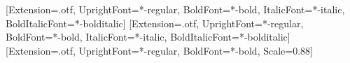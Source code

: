 \usepackage[preprint,nonatbib]{neurips_2025}
\usepackage{fontspec}
\setmainfont{texgyretermes}[Extension=.otf, UprightFont=*-regular, BoldFont=*-bold, ItalicFont=*-italic, BoldItalicFont=*-bolditalic]
\setsansfont{texgyreheros}[Extension=.otf, UprightFont=*-regular, BoldFont=*-bold, ItalicFont=*-italic, BoldItalicFont=*-bolditalic]
\setmonofont{texgyrecursor}[Extension=.otf, UprightFont=*-regular, BoldFont=*-bold, Scale=0.88]
\usepackage{newunicodechar}
\usepackage{xcolor}
\usepackage{pdflscape}
\usepackage{framed}
\usepackage{caption}
\captionsetup{font=small, labelfont=bf, justification=raggedright, singlelinecheck=false}
\usepackage{float}
\renewenvironment{quote}{\begin{leftbar}\small}{\end{leftbar}}
\setlength{\emergencystretch}{3em}
\usepackage{microtype}
\setlength{\LTpre}{6pt}\setlength{\LTpost}{6pt}
